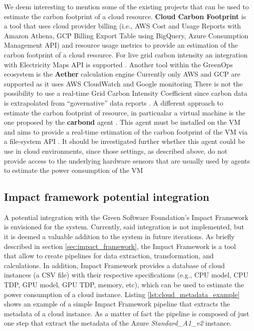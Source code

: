 We deem interesting to mention some of the existing projects that can be used to estimate the carbon footprint of a cloud resource.
\textbf{Cloud Carbon Footprint} \cite{cloud_carbon_footprint} is a tool that uses cloud provider billing (i.e., AWS Cost and Usage Reports with Amazon Athena, GCP Billing Export Table using BigQuery, Azure Consumption Management API) and resource usage metrics to provide an estimation of the carbon footprint of a cloud resource. For live grid carbon intensity an integration with Electricity Maps API is supported \cite{cloud_carbon_footprint}.
Another tool within the GreenOps ecosystem is the \textbf{Aether} calculation engine \cite{aether}
Currently only AWS and GCP are supported as it uses AWS CloudWatch and Google monitoring
There is not the possibility to use a real-time Grid Carbon Intensity Coefficient since carbon data is extrapolated from “governative” data reports \cite{aether}.
A different approach to estimate the carbon footprint of resource, in particualar a virtual machine is the one proposed by the \textbf{carbond} agent \cite{carbond:2023:hotcarbon}. 
This agent must be installed on the VM and aims to provide a real-time estimation of the carbon footprint of the VM via a file-system API \cite{carbond:2023:hotcarbon}.
It should be investigated further whether this agent could be use in cloud environments, since those settings, as described above, do not provide access to the underlying hardware sensors that are usually used by agents to estimate the power consumption of the VM


\subsection{Impact framework potential integration}
\label{sec:impact_framework_integration}

A potential integration with the Green Software Foundation's Impact Framework is envisioned for the system.
Currently, said integration is not implemented, but it is deemed a valuable addition to the system in future iterations.
As briefly described in section \ref{sec:impact_framework}, the Impact Framework is a tool that allow to create pipelines for data extraction, transformation, and calculations.
In addition, Impact Framework provides a database of cloud instances (a CSV file) with their respective specifications (e.g., CPU model, CPU TDP, GPU model, GPU TDP, memory, etc), which can be used to estimate the power consumption of a cloud instance.
Listing \ref{lst:cloud_metadata_example} shows an example of a simple Impact Framework pipeline that extracts the metadata of a cloud instance.
As a matter of fact the pipeline is composed of just one step that extract the metadata of the Azure \textit{Standard\_A1\_v2} instance. \newline

